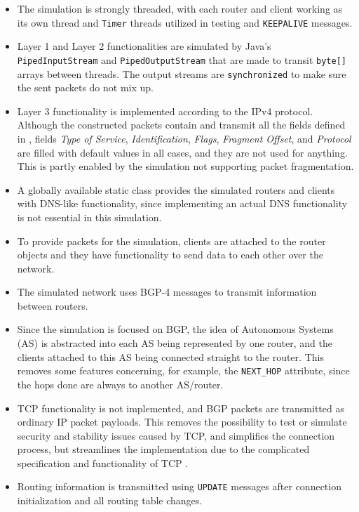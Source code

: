 \documentclass[10pt,a4paper,titlepage]{report}
\begin{document}
\begin{itemize}
\item The simulation is strongly threaded, with each router and client working as its own thread and \texttt{Timer} threads utilized in testing and \texttt{KEEPALIVE} messages.
\item Layer 1 and Layer 2 functionalities are simulated by Java's \texttt{PipedInputStream} and \texttt{PipedOutputStream} that are made to transit \texttt{byte[]} arrays between threads. The output streams are \texttt{synchronized} to make sure the sent packets do not mix up.
\item Layer 3 functionality is implemented according to the IPv4 protocol. Although the constructed packets contain and transmit all the fields defined in \cite{RFC0791}, fields \emph{Type of Service}, \emph{Identification}, \emph{Flags}, \emph{Fragment Offset}, and \emph{Protocol} are filled with default values in all cases, and they are not used for anything. This is partly enabled by the simulation not supporting packet fragmentation.
\item A globally available static class provides the simulated routers and clients with DNS-like functionality, since implementing an actual DNS functionality is not essential in this simulation.
\item To provide packets for the simulation, clients are attached to the router objects and they have functionality to send data to each other over the network.
\item The simulated network uses BGP-4 messages to transmit information between routers.
\item Since the simulation is focused on BGP, the idea of Autonomous Systems (AS) is abstracted into each AS being represented by one router, and the clients attached to this AS being connected straight to the router. This removes some features concerning, for example, the \texttt{NEXT\_HOP} attribute, since the hops done are always to another AS/router.
\item TCP functionality is not implemented, and BGP packets are transmitted as ordinary IP packet payloads. This removes the possibility to test or simulate security and stability issues caused by TCP, and simplifies the connection process, but streamlines the implementation due to the complicated specification and functionality of TCP \cite{RFC0793}.
\item Routing information is transmitted using \texttt{UPDATE} messages after connection initialization and all routing table changes.

\end{itemize}
\end{document}
